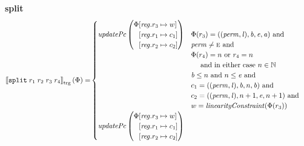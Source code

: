 \documentclass[a4paper]{article}
\newcommand{\sem}[1]{\left\llbracket #1 \right\rrbracket}
\newcommand{\tsem}[2][\Phi]{\sem{#2}_{\mathrm{trg}}(#1)}
\newcommand{\tand}{\text{ and }}
\newcommand{\tor}{\text{ or }}
\newcommand{\targetcolor}[1]{\color{black}}
\newcommand{\trg}[1]{{\targetcolor{} #1}}
\newcommand{\zinstr}[1]{\texttt{#1}}
\newcommand{\fourinstr}[5]{
  \ifthenelse{\equal{#2#3#4#5}{}}
  {\zinstr{#1}}
  {\zinstr{#1} \; #2 \; #3 \; #4 \; #5}
}
\newcommand{\tsplit}[4]{\fourinstr{\trg{split}}{#1}{#2}{#3}{#4}}
\newcommand{\nats}{\mathbb{N}}
\newcommand{\update}[2]{[#1 \mapsto #2]}
\newcommand{\updReg}[2]{\update{\reg.#1}{#2}}
\newcommand{\perm}{\var{perm}}
\newcommand{\lin}{\var{l}}
\newcommand{\var}[1]{\mathit{#1}}
\newcommand{\reg}{\var{reg}}
\newcommand{\baddr}{\var{b}}
\newcommand{\eaddr}{\var{e}}
\newcommand{\aaddr}{\var{a}}
\newcommand{\plainperm}[1]{\textsc{#1}}
\newcommand{\enter}{\plainperm{e}}
\newcommand{\plainfun}[2]{
  \ifthenelse{\equal{#2}{}}
  {\mathit{#1}}
  {\mathit{#1}(#2)}
}
\newcommand{\updPcAddr}[1]{\plainfun{updatePc}{#1}}
\newcommand{\linCons}[1]{\plainfun{linearityConstraint}{#1}}
\begin{document}
\textbf{split}\\
\begin{align*}
  \tsem{\tsplit{r_1}{r_2}{r_3}{r_4}} = &
                               \begin{cases}
                                 \updPcAddr{}\left(
                                   \arraycolsep=0pt
                                   \begin{array}{rl}
                                     \Phi&\updReg{r_3}{w}\\
                                         &\updReg{r_1}{c_1}\\
                                         &\updReg{r_2}{c_2}
                                   \end{array}\right)
&
                                 \arraycolsep=0pt
                                 \begin{array}[t]{l}
                                   \Phi(r_3) = ((\perm,\lin),\baddr,\eaddr,\aaddr) \tand \\
                                   \perm \neq \enter \tand \\
                                   \Phi(r_4) = n \tor r_4 = n \\
                                   \quad\text{ and in either case } n \in \nats \\
                                   \baddr \leq n \tand n \leq \eaddr \tand \\
                                   c_1 = ((\perm,\lin),\baddr,n,\baddr) \tand \\
                                   c_2 = ((\perm,\lin),n+1,\eaddr,n+1) \tand \\
                                   w = \linCons{\Phi(r_3)}
                                 \end{array}\\
                                 \updPcAddr{} \left(
                                 \arraycolsep=0pt
                                 \begin{array}{rl}
                                   \Phi&\updReg{r_3}{w}\\
                                       &\updReg{r_1}{c_1}\\
                                       &\updReg{r_2}{c_2}
                                 \end{array} \right)
&
                                 \arraycolsep=0pt
                                 \begin{array}[t]{l}

\end{array}
\end{cases}
\end{align*}
\end{document}
